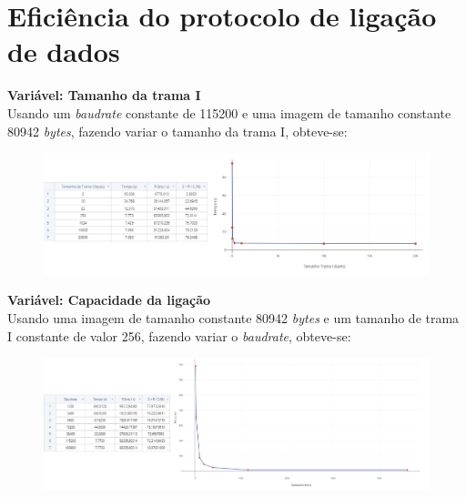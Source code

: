 \documentclass[a4paper, 11pt]{article}
\begin{document}
\section{Eficiência do protocolo de ligação de dados}

\textbf{Variável: Tamanho da trama I}\\
Usando um \textit{baudrate} constante de 115200 e uma imagem de tamanho constante 80942 \textit{bytes}, fazendo variar o tamanho da trama I, obteve-se:
\begin{figure}[h!]
\begin{center}
\includegraphics[scale=0.4]{images/TamanhoTrama.png}
\end{center}
\end{figure}

\textbf{Variável: Capacidade da ligação}\\
Usando uma imagem de tamanho constante 80942 \textit{bytes} e um tamanho de trama I constante de valor 256, fazendo variar o \textit{baudrate}, obteve-se:
\begin{figure}[h!]
\begin{center}
\includegraphics[scale=0.35]{images/Baudrate.png}
\end{center}
\end{figure}
\end{document}
